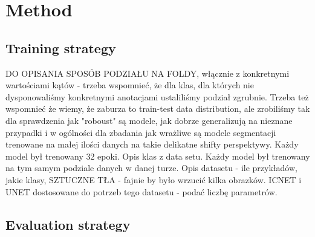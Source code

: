 \documentclass{article}
\begin{document}
\section{Method}
\label{sec:method}

\subsection{Training strategy}
DO OPISANIA SPOSÓB PODZIAŁU NA FOLDY, włącznie z konkretnymi wartościami kątów - trzeba wspomnieć, że dla klas, dla których nie dysponowaliśmy konkretnymi anotacjami ustaliliśmy podział zgrubnie. Trzeba też wspomnieć że wiemy, że zaburza to train-test data distribution, ale zrobiliśmy tak dla sprawdzenia jak "roboust" są modele, jak dobrze generalizują na nieznane przypadki i w ogólności dla zbadania jak wrażliwe są modele segmentacji trenowane na małej ilości danych na takie delikatne shifty perspektywy. Każdy model był trenowany 32 epoki. Opis klas z data setu. Każdy model był trenowany na tym samym podziale danych w danej turze. Opis datasetu - ile przykładów, jakie klasy, SZTUCZNE TŁA - fajnie by było wrzucić kilka obrazków. ICNET i UNET dostosowane do potrzeb tego datasetu - podać liczbę parametrów.

\subsection{Evaluation strategy}
\label{sec:eval_strategy}
\end{document}
